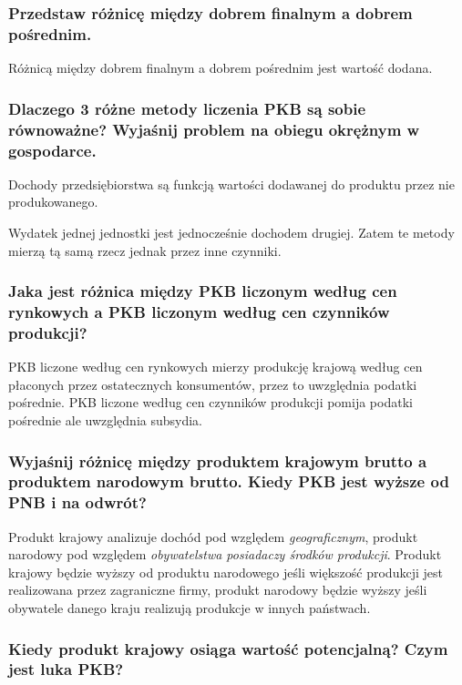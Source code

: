 \documentclass[a4paper,12pt]{article}
\begin{document}
\subsubsection{Przedstaw różnicę między dobrem finalnym a dobrem pośrednim.}

Różnicą między dobrem finalnym a dobrem pośrednim jest wartość dodana.

\subsubsection{Dlaczego 3 różne metody liczenia PKB są sobie równoważne? Wyjaśnij problem na obiegu okrężnym w gospodarce.}\label{metodyPKB-równe}

Dochody przedsiębiorstwa są funkcją wartości dodawanej do produktu przez nie produkowanego.

Wydatek jednej jednostki jest jednocześnie dochodem drugiej.
Zatem te metody mierzą tą samą rzecz jednak przez inne czynniki.

\subsubsection{Jaka jest różnica między PKB liczonym według cen rynkowych a PKB liczonym według cen czynników produkcji?}

PKB liczone według cen rynkowych mierzy produkcję krajową według cen płaconych przez ostatecznych konsumentów, przez to uwzględnia podatki pośrednie. PKB liczone według cen czynników produkcji pomija podatki pośrednie ale uwzględnia subsydia.


\subsubsection{Wyjaśnij  różnicę między produktem krajowym brutto a produktem narodowym brutto. Kiedy PKB jest wyższe od PNB i na odwrót?}

Produkt krajowy analizuje dochód pod względem \emph{geograficznym},  produkt narodowy pod względem \emph{obywatelstwa posiadaczy środków produkcji}. Produkt krajowy będzie wyższy od produktu narodowego jeśli większość produkcji jest realizowana przez zagraniczne firmy, produkt narodowy będzie wyższy jeśli obywatele danego kraju realizują produkcje w innych państwach.

\subsubsection{Kiedy produkt krajowy osiąga wartość potencjalną? Czym jest luka PKB?}
\end{document}
